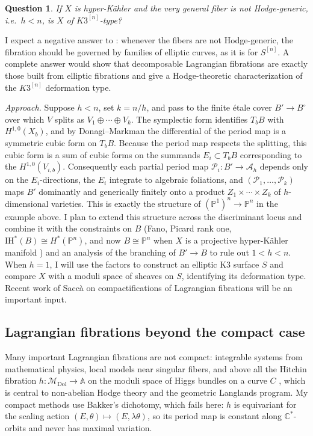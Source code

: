 \documentclass[11pt]{article}
\newcommand{\C}{\mathbb{C}}
\newcommand{\bbA}{\mathbb{A}}
\newcommand{\bbP}{\mathbb{P}}
\newcommand{\cA}{\mathcal{A}}
\newcommand{\cM}{\mathcal{M}}
\newcommand{\cP}{\mathcal{P}}
\newcommand{\IH}{\mathrm{IH}}
\theoremstyle{compact}
\newtheorem{question}{Question}
\begin{document}
\begin{question}\label{q:k3n}
If $X$ is hyper-K\"ahler and the very general fiber is not Hodge-generic, i.e.\ $h<n$, is
$X$ of $K3^{[n]}$-type?
\end{question}

I expect a negative answer to : whenever the fibers are not
Hodge-generic, the fibration should be governed by families of elliptic curves, as it is
for $S^{[n]}$. A complete answer would show that decomposable Lagrangian fibrations
are exactly those built from elliptic fibrations and give a Hodge-theoretic characterization
of the $K3^{[n]}$ deformation type.


\emph{Approach.} Suppose $h<n$, set $k=n/h$, and pass to the finite \'etale cover
$B'\to B^\circ$ over which $V$ splits as $V_1\oplus\cdots\oplus V_k$. The symplectic form
identifies $T_bB$ with $H^{1,0}(X_b)$, and by Donagi--Markman \cite{donagi-markman96} the
differential of the period map is a symmetric cubic form on $T_bB$. Because the period map
respects the splitting, this cubic form is a sum of cubic forms on the summands
$E_i\subset T_bB$ corresponding to the $H^{1,0}(V_{i,b})$. Consequently each partial period
map $\cP_i\colon B'\to\cA_h$ depends only on the $E_i$-directions, the $E_i$ integrate to
algebraic foliations, and $(\cP_1,\dots,\cP_k)$ maps $B'$ dominantly and generically finitely
onto a product $Z_1\times\cdots\times Z_k$ of $h$-dimensional varieties. This is exactly the
structure of $(\bbP^1)^n\to\bbP^n$ in the example above. I plan to extend this structure
across the discriminant locus and combine it with the constraints on $B$ (Fano, Picard rank
one, $\IH^*(B)\cong H^*(\bbP^n)$, and now $B\cong\bbP^n$ when $X$ is a projective
hyper-K\"ahler manifold \cite{openai-bases26}) and an analysis of the branching of $B'\to B$
to rule out $1<h<n$. When $h=1$, I will use the factors to construct an elliptic K3 surface $S$ and
compare $X$ with a moduli space of sheaves on $S$, identifying its deformation type. Recent
work of Sacc\`a on compactifications of Lagrangian fibrations \cite{sacca25} will be an important
input.


\subsection{Lagrangian fibrations beyond the compact case}

Many important Lagrangian fibrations are not compact: integrable systems from mathematical
physics, local models near singular fibers, and above all the Hitchin fibration
$h\colon\cM_{\mathrm{Dol}}\to\bbA$ on the moduli space of Higgs bundles on a curve $C$
\cite{hitchin87}, which is central to non-abelian Hodge theory and the geometric Langlands
program. My compact methods use Bakker's dichotomy, which fails here: $h$ is equivariant for
the scaling action $(E,\theta)\mapsto(E,\lambda\theta)$, so its period map is constant along
$\C^*$-orbits and never has maximal variation.
\end{document}
